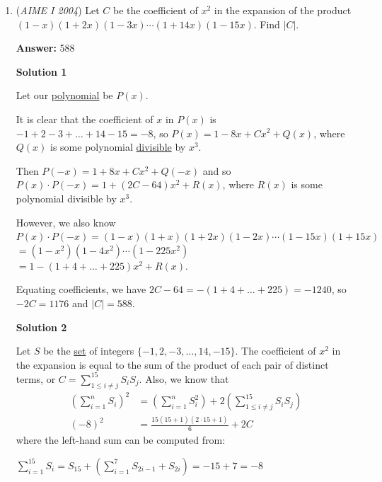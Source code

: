 \begin{enumerate}
 $3 \cdot \dbinom{10}{4} = 630$

 For those 3 cases there are 630 ways. 

 Thus, our answer is 630+252 = $\boxed{882}$.

 -Alexlikemath

 


	\item (\textit{AIME I 2004}) Let $C$ be the coefficient of $x^2$ in the expansion of the product $(1 - x)(1 + 2x)(1 - 3x)\cdots(1 + 14x)(1 - 15x).$ Find $|C|.$

 \textbf{Answer: }588



\textbf{Solution 1}

Let our \href{https://artofproblemsolving.com/wiki/index.php?title=Polynomial}{polynomial} be $P(x)$.

 It is clear that the coefficient of $x$ in $P(x)$ is $-1 + 2 - 3 + \ldots + 14 - 15 = -8$, so $P(x) = 1 -8x + Cx^2 + Q(x)$, where $Q(x)$ is some polynomial \href{https://artofproblemsolving.com/wiki/index.php?title=Divisibility}{ divisible} by $x^3$.

 Then $P(-x) = 1 + 8x + Cx^2 + Q(-x)$ and so $P(x)\cdot P(-x) = 1 + (2C - 64)x^2 + R(x)$, where $R(x)$ is some polynomial divisible by $x^3$.

 However, we also know $P(x)\cdot P(-x) = (1 - x)(1 + x)(1 +2x)(1 - 2x) \cdots (1 - 15x)(1 + 15x)$ $= (1 - x^2)(1 - 4x^2)\cdots(1 - 225x^2)$ $= 1 - (1 + 4 + \ldots + 225)x^2 + R(x)$.

 Equating coefficients, we have $2C - 64 = -(1 + 4 + \ldots + 225) = -1240$, so $-2C = 1176$ and $|C| = \boxed{588}$.

 



\textbf{Solution 2}

Let $S$ be the \href{https://artofproblemsolving.com/wiki/index.php?title=Set}{set} of integers $\{-1,2,-3,\ldots,14,-15\}$. The coefficient of $x^2$ in the expansion is equal to the sum of the product of each pair of distinct terms, or $C = \sum_{1 \le i \neq j}^{15} S_iS_j$. Also, we know that 
 \begin{align*}\left(\sum_{i=1}^{n} S_i\right)^2 &= \left(\sum_{i=1}^{n} S_i^2\right) + 2\left(\sum_{1 \le i \neq j}^{15} S_iS_j\right)\\ (-8)^2 &= \frac{15(15+1)(2\cdot 15+1)}{6} + 2C\end{align*}
where the left-hand sum can be computed from:

 $\sum_{i=1}^{15} S_i = S_{15} + \left(\sum_{i=1}^{7} S_{2i-1} + S_{2i}\right) = -15 + 7 = -8$


\end{enumerate}

